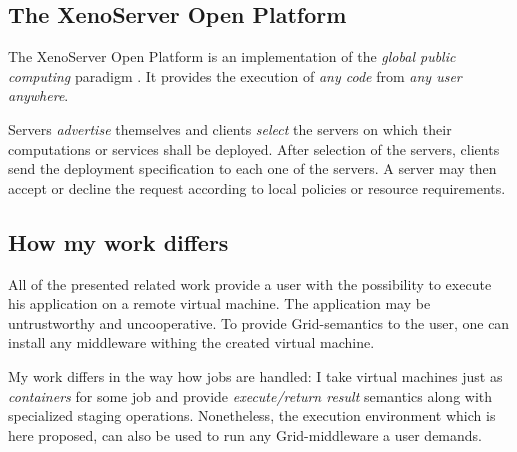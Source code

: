 \subsection{The XenoServer Open Platform}

The  XenoServer Open  Platform is  an implementation  of  the \emph{global
  public   computing}  paradigm   \cite{kotsovinos05}.  It   provides  the
execution of \emph{any code} from \emph{any user} \emph{anywhere}.

Servers \emph{advertise} themselves  and clients \emph{select} the servers
on which their computations or services shall be deployed. After selection
of the servers,  clients send the deployment specification  to each one of
the servers. A server may then  accept or decline the request according to
local policies or resource requirements.


\subsection{How my work differs}

All of the  presented related work provide a user  with the possibility to
execute his application on a  remote virtual machine.  The application may
be untrustworthy and uncooperative. To provide Grid-semantics to the user,
one can install any middleware withing the created virtual machine.

My work differs  in the way how jobs are handled:  I take virtual machines
just as  \emph{containers} for  some job and  provide \emph{execute/return
  result}      semantics      along      with     specialized      staging
operations. Nonetheless, the execution environment which is here proposed,
can also be used to run any Grid-middleware a user demands.


